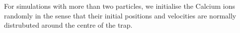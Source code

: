 For simulations with more than two particles, we initialise the Calcium ions randomly in the sense that their initial positions and velocities are normally distrubuted around the centre of the trap.










































